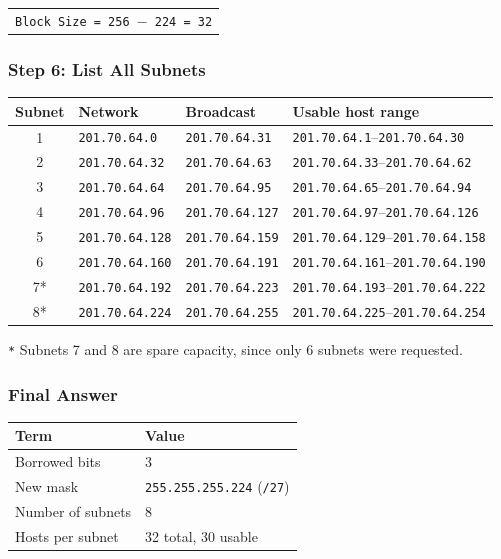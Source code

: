 \documentclass[11pt,a4paper]{article}
\begin{document}
\begin{tabularx}{\textwidth}{@{}X@{}}
\texttt{Block Size = 256 $-$ 224 = 32} \\
\end{tabularx}

\subsubsection*{Step 6: List All Subnets}

\begin{tabularx}{\textwidth}{@{}clll@{}}
\toprule
\rowcolor{tablehead}\textbf{Subnet} & \textbf{Network} & \textbf{Broadcast} & \textbf{Usable host range} \\
\midrule
1 & \texttt{201.70.64.0} & \texttt{201.70.64.31} & \texttt{201.70.64.1}--\texttt{201.70.64.30} \\
2 & \texttt{201.70.64.32} & \texttt{201.70.64.63} & \texttt{201.70.64.33}--\texttt{201.70.64.62} \\
3 & \texttt{201.70.64.64} & \texttt{201.70.64.95} & \texttt{201.70.64.65}--\texttt{201.70.64.94} \\
4 & \texttt{201.70.64.96} & \texttt{201.70.64.127} & \texttt{201.70.64.97}--\texttt{201.70.64.126} \\
5 & \texttt{201.70.64.128} & \texttt{201.70.64.159} & \texttt{201.70.64.129}--\texttt{201.70.64.158} \\
6 & \texttt{201.70.64.160} & \texttt{201.70.64.191} & \texttt{201.70.64.161}--\texttt{201.70.64.190} \\
7* & \texttt{201.70.64.192} & \texttt{201.70.64.223} & \texttt{201.70.64.193}--\texttt{201.70.64.222} \\
8* & \texttt{201.70.64.224} & \texttt{201.70.64.255} & \texttt{201.70.64.225}--\texttt{201.70.64.254} \\
\bottomrule
\end{tabularx}

\noindent \texttt{*} Subnets 7 and 8 are spare capacity, since only 6 subnets were requested.

\subsubsection*{Final Answer}

\begin{tabularx}{\textwidth}{@{}lX@{}}
\toprule
\rowcolor{tablehead}\textbf{Term} & \textbf{Value} \\
\midrule
Borrowed bits & 3 \\
New mask & \texttt{255.255.255.224} (\texttt{/27}) \\
Number of subnets & 8 \\
Hosts per subnet & 32 total, 30 usable \\
\bottomrule
\end{tabularx}
\end{document}

